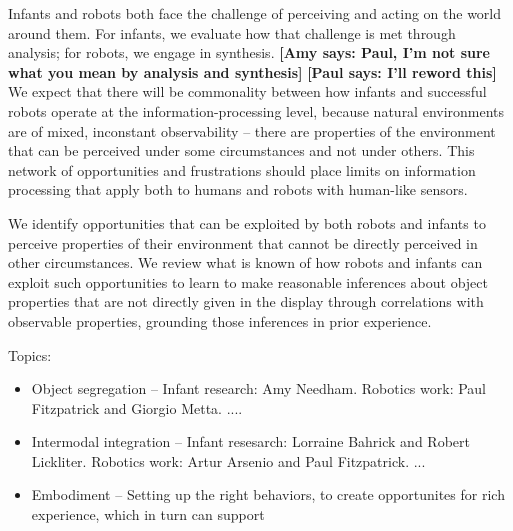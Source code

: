
Infants and robots both face the challenge of perceiving and acting on
the world around them.  For infants, we evaluate how that challenge is
met through analysis; for robots, we engage in synthesis.  
%
{\bf [Amy says: Paul, I'm not sure what you mean by analysis and synthesis]}
{\bf [Paul says: I'll reword this]}
%
We expect
that there will be commonality between how infants and successful
robots operate at the information-processing level, because natural
environments are of mixed, inconstant observability -- there are
properties of the environment that can be perceived under some
circumstances and not under others.  This network of opportunities and
frustrations should place limits on information processing that apply
both to humans and robots with human-like sensors.

We identify opportunities that can be exploited by both robots and
infants to perceive properties of their environment that cannot be
directly perceived in other circumstances.  We review what is known of
how robots and infants can exploit such opportunities to learn to make
reasonable inferences 
%
%
about object properties that are not directly given in the display
%
through correlations
with observable properties, grounding those inferences in prior
experience.

Topics:

\begin{itemize}

\item Object segregation --
  Infant research: Amy Needham.
  Robotics work: Paul Fitzpatrick and Giorgio Metta. ....

\item Intermodal integration --
  Infant resesarch: Lorraine Bahrick and Robert Lickliter.
  Robotics work: Artur Arsenio and Paul Fitzpatrick. ...

\item Embodiment -- 
  Setting up the right behaviors, to create opportunites
  for rich experience, which in turn can support 



\end{itemize}

